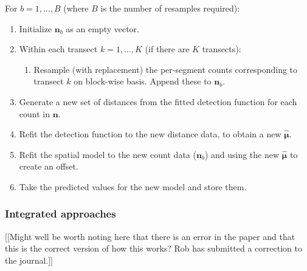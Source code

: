 \documentclass[useAMS,referee]{biom}
\begin{document}
For $b=1,\ldots,B$ (where $B$ is the number of resamples required):
\begin{enumerate}
	\item Initialize $\mathbf{n}_b$ as an empty vector.
	\item Within each transect $k=1,\ldots,K$ (if there are $K$ transects):
	\begin{enumerate}
		\item Resample (with replacement) the per-segment counts corresponding to transect $k$ on block-wise basis. Append these to $\mathbf{n}_b$.
	\end{enumerate}
	\item Generate a new set of distances from the fitted detection function for each count in $\mathbf{n}$.
	\item Refit the detection function to the new distance data, to obtain a new $\bm{\hat{\mu}}$.
	\item Refit the spatial model to the new count data ($\mathbf{n}_b$) and using the new $\bm{\hat{\mu}}$ to create an offset.
	\item Take the predicted values for the new model and store them.
\end{enumerate}



\subsubsection{Integrated approaches}

[[Might well be worth noting here that there is an error in the paper and that this is the correct version of how this works? Rob has submitted a correction to the journal.]]
\end{document}
